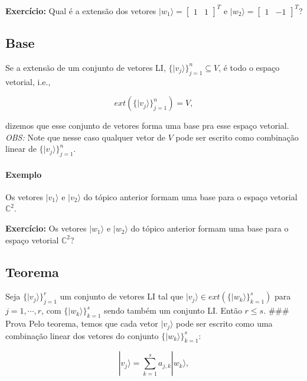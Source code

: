 \documentclass[11pt]{article}
\begin{document}
\textbf{Exercício:} Qual é a extensão dos vetores
\(|w_{1}\rangle=\begin{bmatrix} 1 & 1 \end{bmatrix}^{T}\) e
\(|w_{2}\rangle=\begin{bmatrix} 1 & -1 \end{bmatrix}^{T}\)?

    \subsection{Base}\label{base}

Se a extensão de um conjunto de vetores LI,
\(\{|v_{j}\rangle\}_{j=1}^{n}\subseteq V\), é todo o espaço vetorial,
i.e.,

\begin{equation}
ext(\{|v_{j}\rangle\}_{j=1}^{n}) = V,
\end{equation}

dizemos que esse conjunto de vetores forma uma base pra esse espaço
vetorial. \emph{OBS:} Note que nesse caso qualquer vetor de \(V\) pode
ser escrito como combinação linear de \(\{|v_{j}\rangle\}_{j=1}^{n}\).

\paragraph{Exemplo}\label{exemplo}

Os vetores \(|v_{1}\rangle\) e \(|v_{2}\rangle\) do tópico anterior
formam uma base para o espaço vetorial \(\mathbb{C}^{2}\).

\textbf{Exercício:} Os vetores \(|w_{1}\rangle\) e \(|w_{2}\rangle\) do
tópico anterior formam uma base para o espaço vetorial
\(\mathbb{C}^{2}\)?

    \subsection{Teorema}\label{teorema}

Seja \(\{|v_{j}\rangle\}_{j=1}^{r}\) um conjunto de vetores LI tal que
\(|v_{j}\rangle\in ext(\{|w_{k}\rangle\}_{k=1}^{s})\) para
\(j=1,\cdots,r\), com \(\{|w_{k}\rangle\}_{k=1}^{s}\) sendo também um
conjunto LI. Então \(r\le s\). \#\#\# Prova Pelo teorema, temos que cada
vetor \(|v_{j}\rangle\) pode ser escrito como uma combinação linear dos
vetores do conjunto \(\{|w_{k}\rangle\}_{k=1}^{s}\):

\begin{equation}
|v_{j}\rangle=\sum_{k=1}^{s}a_{j,k}|w_{k}\rangle,
\end{equation}
\end{document}
